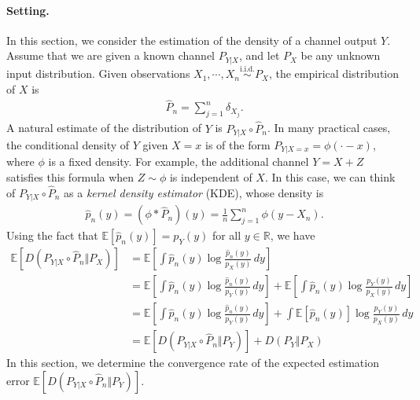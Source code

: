 \documentclass{article}
\numberwithin{equation}{section}
\newcommand{\E}{\mathbb{E}}
\newcommand{\bbR}{\mathbb{R}}
\newcommand{\wh}{\widehat}
\theoremstyle{plain}
\theoremstyle{definition}
\begin{document}
\paragraph{Setting.} In this section, we consider the estimation of the density of a channel output $Y$. Assume that we are given a known channel $P_{Y|X}$, and let $P_X$ be any unknown input distribution. Given observations $X_1,\cdots,X_n\overset{\text{i.i.d.}}{\sim}P_X$, the empirical distribution of $X$ is
\begin{align*}
	\wh{P}_n=\sum_{j=1}^n\delta_{X_j}.
\end{align*}
A natural estimate of the distribution of $Y$ is $P_{Y|X}\circ\wh{P}_n$. In many practical cases, the conditional density of $Y$ given $X=x$ is of the form $P_{Y|X=x}=\phi(\cdot -x)$, where $\phi$ is a fixed density. For example, the additional channel $Y=X+Z$ satisfies this formula when $Z\sim\phi$ is independent of $X$. In this case, we can think of $P_{Y|X}\circ\wh{P}_n$ as a \textit{kernel density estimator} (KDE), whose density is
\begin{align*}
	\wh{p}_n(y)=(\phi * \wh{P}_n)(y)=\frac{1}{n}\sum_{j=1}^n \phi(y-X_n).
\end{align*}
Using the fact that $\E[\wh{p}_n(y)]=p_Y(y)$ for all $y\in\bbR$, we have
\begin{align*}
	\E\left[D(P_{Y|X}\circ\wh{P}_n\Vert P_X)\right]&=\E\left[\int\wh{p}_n(y)\log\frac{\wh{p}_n(y)}{p_X(y)}\,dy\right]\\
	&=\E\left[\int\wh{p}_n(y)\log\frac{\wh{p}_n(y)}{p_Y(y)}\,dy\right]+\E\left[\int\wh{p}_n(y)\log\frac{p_Y(y)}{p_X(y)}\,dy\right]\\
	&=\E\left[\int\wh{p}_n(y)\log\frac{\wh{p}_n(y)}{p_Y(y)}\,dy\right]+\int\E\left[\wh{p}_n(y)\right]\log\frac{p_Y(y)}{p_X(y)}\,dy\\
	&=\E\left[D(P_{Y|X}\circ\wh{P}_n\Vert P_Y)\right]+D(P_Y\Vert P_X)
\end{align*}
In this section, we determine the convergence rate of the expected estimation error $\E[D(P_{Y|X}\circ\wh{P}_n\Vert P_Y)]$.
\end{document}
